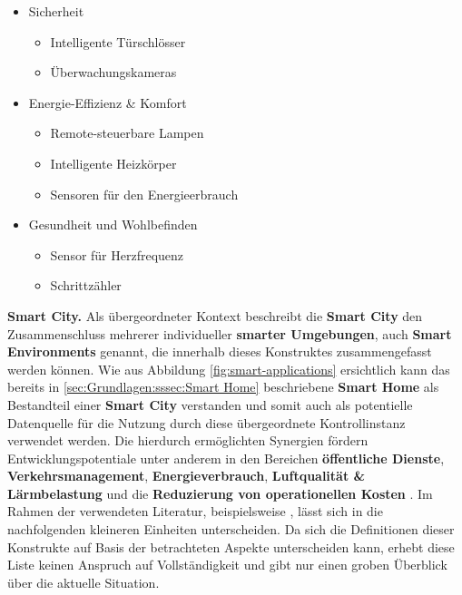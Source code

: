 \begin{itemize}
	\item Sicherheit
		\begin{itemize}
			\item Intelligente Türschlösser
			\item Überwachungskameras
		\end{itemize}
	\item Energie-Effizienz \& Komfort
		\begin{itemize}
			\item Remote-steuerbare Lampen
			\item Intelligente Heizkörper
			\item Sensoren für den Energieerbrauch
		\end{itemize}
	\item Gesundheit und Wohlbefinden
		\begin{itemize}
			\item Sensor für Herzfrequenz
			\item Schrittzähler
		\end{itemize}
\end{itemize}


\noindent \textbf{Smart City.}
Als übergeordneter Kontext beschreibt die \textbf{Smart City} den Zusammenschluss mehrerer individueller \textbf{smarter Umgebungen}, auch \textbf{Smart Environments} genannt, die innerhalb dieses Konstruktes zusammengefasst werden können. Wie aus Abbildung \ref{fig:smart-applications} ersichtlich kann das bereits in \ref{sec:Grundlagen:sssec:Smart Home} beschriebene \textbf{Smart Home} als Bestandteil einer \textbf{Smart City} verstanden und somit auch als potentielle Datenquelle für die Nutzung durch diese übergeordnete Kontrollinstanz verwendet werden. Die hierdurch ermöglichten Synergien fördern Entwicklungspotentiale unter anderem in den Bereichen \textbf{öffentliche Dienste}, \textbf{Verkehrsmanagement}, \textbf{Energieverbrauch}, \textbf{Luftqualität \& Lärmbelastung} und die \textbf{Reduzierung von operationellen Kosten} \cite{Bastos2018}.
Im Rahmen der verwendeten Literatur, beispielsweise \cite{Bastos2018,Cui2018,SecPrivSmartCity2021}, lässt sich in die nachfolgenden kleineren Einheiten unterscheiden. Da sich die Definitionen dieser Konstrukte auf Basis der betrachteten Aspekte unterscheiden kann, erhebt diese Liste keinen Anspruch auf Vollständigkeit und gibt nur einen groben Überblick über die aktuelle Situation.

